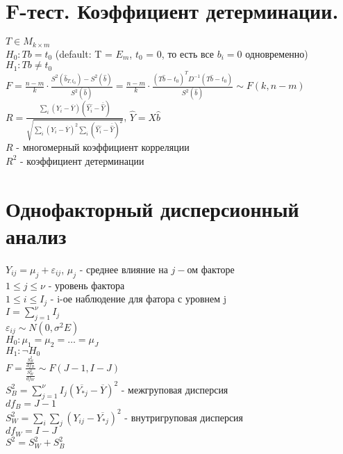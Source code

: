 \documentclass{article}
\newcommand\0{\mathbb{0}}
\newcommand\1{\mathbb{1}}
\begin{document}
\section{F-тест. Коэффициент детерминации.}
$T \in M_{k \times m}$\\
$H_0: Tb = t_0$ (default: T = $E_m$, $t_0$ = 0, то есть все $b_i = 0$ одновременно)\\
$H_1: Tb \neq t_0$\\
$F = \frac{n - m}{k} \cdot \frac{S^2(\widehat{b}_{T, t_0}) - S^2(\widehat{b})}{S^2(\widehat{b})} = \frac{n - m}{k} \cdot \frac{(T\widehat{b} - t_0)^TD^{-1}(T\widehat{b} - t_0)}{S^2(\widehat{b})} \sim F(k, n - m)$\\
$R = \frac{\displaystyle\sum_i (Y_i - \overline{Y})(\widehat{Y_i} - \overline{\widehat{Y}})}{\sqrt{\displaystyle\sum_i (Y_i - \overline{Y})^2\displaystyle\sum_i(\widehat{Y_i} - \overline{\widehat{Y}})^2}}$, $\widehat{Y} = X\widehat{b}$\\
$R$ - многомерный коэффициент корреляции\\
$R^2$ - коэффициент детерминации
\section{Однофакторный дисперсионный анализ}
$Y_{ij} = \mu_j + \varepsilon_{ij}$, $\mu_j$ - среднее влияние на $j-$ом факторе\\
$1 \leq j \leq \nu$ - уровень фактора\\
$1 \leq i \leq I_j$ - i-ое наблюдение для фатора с уровнем j\\
$I = \displaystyle\sum_{j = 1}^\nu I_j$\\
$\varepsilon_{ij} \sim N(0, \sigma^2E)$\\
$H_0: \mu_1 = \mu_2 = \dots = \mu_J$\\
$H_1: \neg H_0$\\
$F = \frac{\frac{S_B^2}{df_B}}{\frac{S_W^2}{df_W}} \sim F(J - 1, I - J)$\\
$S_B^2 = \displaystyle\sum_{j = 1}^\nu I_j (\overline{Y_{*j}} - \overline{Y})^2$ - межгруповая дисперсия\\
$df_B = J - 1$\\
$S_W^2 = \displaystyle\sum_i \displaystyle\sum_j (Y_{ij} - \overline{Y_{*j}})^2$ - внутригруповая дисперсия\\
$df_W = I - J$\\
$S^2 = S_W^2 + S_B^2$\\
\end{document}
